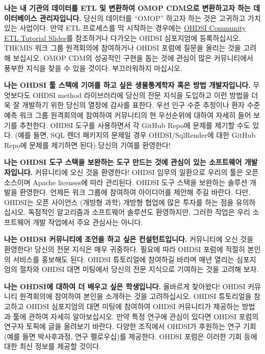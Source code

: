 \documentclass[11pt]{book}
\theoremstyle{definition}
\theoremstyle{definition}
\theoremstyle{definition}
\theoremstyle{remark}
\begin{document}
\textbf{나는 내 기관의 데이터를 ETL 및 변환하여 OMOP CDM으로 변환하고자
하는 데이터베이스 관리자입니다.} 당신의 데이터를 ``OMOP'' 하고자 하는
것은 고귀하고 가치 있는 사업이다. 만약 ETL 프로세스를 막 시작하는
경우에는
\href{https://www.ohdsi-europe.org/images/symposium-2019/tutorials/OHDSI_Vocabulary_CDM_Tutorial.pdf}{OHDSI
Community ETL Tutorial Slides}를 참조하거나 다가오는 OHDSI 심포지엄에
등록하십시오. THEMIS 워크 그룹 원격회의에 참여하거나 OHDSI 포럼에 질문을
올리는 것을 고려해 보십시오. OMOP CDM의 성공적인 구현을 돕는 것에 관심이
많은 커뮤니티에서 풍부한 지식을 찾을 수 있을 것이다. 부끄러워하지
마십시오.

\textbf{나는 OHDSI 툴 스택에 기여를 하고 싶은 생물통계학자 혹은 방법
개발자입니다.} 무엇보다도 OHDSI method 라이브러리에 당신의 전문 지식을
도입하고 이런 방법을 더욱 잘 개발하기 위한 당신의 열정에 감사를 표한다.
우선 인구 수준 추정이나 환자 수준 예측 워크 그룹 원격회의에 참여하여
커뮤니티의 현 우선순위에 대하여 자세히 들어 보기를 추천한다. OHDSI
도구를 사용하면서 각 GitHub Repo에 문제를 제기할 수도 있다. (예를 들면,
SQL 렌더 패키지의 문제일 경우 OHDSI/SqlRender에 대한 GitHub Repo에
문제를 제기하면 된다) 당신의 기여를 환영한다!

\textbf{나는 OHDSI 도구 스택을 보완하는 도구 만드는 것에 관심이 있는
소프트웨어 개발자입니다.} 커뮤니티에 오신 것을 환영한다! OHDSI 임무의
일환으로 우리의 툴은 오픈소스이며 Apache licenses에 따라 관리된다. OHDSI
도구 스택을 보완하는 솔루션 개발을 환영한다. 언제든 워크 그룹에 참여하여
아이디어를 제안해 주길 바란다. 다만, OHDSI는 오픈 사이언스 (개방형 과학)
개방형 협업에 많은 투자를 하는 점을 유의하십시오. 독점적인 알고리즘과
소프트웨어 솔루션도 환영하지만, 그러한 작업은 우리 소프트웨어 개발
작업에서 주요 관심사는 아니다.

\textbf{나는 OHDSI 커뮤니티에 조언을 하고 싶은 컨설턴트입니다.}
커뮤니티에 오신 것을 환영한다! 당신의 전문 지식은 매우 귀중하다. 필요에
따라 OHDSI 포럼에 적절히 본인의 서비스를 홍보해도 된다. OHDSI 튜토리얼에
참여하길 바라며 매년 열리는 심포지엄의 절차와 OHDSI 대면 미팅에서 당신의
전문 지식으로 기여하는 것을 고려해 보자.

\textbf{나는 OHDSI에 대하여 더 배우고 싶은 학생입니다.} 올바르게
찾아왔다! OHDSI 커뮤니티 원격회의에 참여하여 본인을 소개하는 것을
고려하십시오. OHDSI 튜토리얼을 참고하고 OHDSI 심포지엄의 대면 미팅에
참여하여 OHDSI 커뮤니티가 제공하는 방법과 툴에 관하여 자세히
알아보십시오. 만약 특정 연구에 관심이 있다면 OHDSI 포럼의 연구자 토픽에
글을 올려보기 바란다. 다양한 조직에서 OHDSI가 후원하는 연구 기회 (예를
들면 박사후과정, 연구 펠로우십)를 제공한다. OHDSI 포럼은 이러한 기회
등에 대한 최신 정보를 제공할 것이다.
\end{document}

